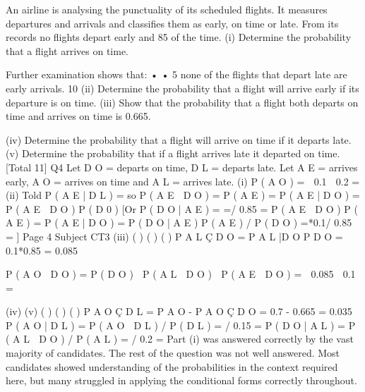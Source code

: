 \documentclass[a4paper,12pt]{article}
\begin{document}
An airline is analysing the punctuality of its scheduled flights. It measures departures
and arrivals and classifies them as early, on time or late. From its records no flights
depart early and 85%
of the time.
(i)
Determine the probability that a flight arrives on time.

Further examination shows that:
•
•
5
none of the flights that depart late are early arrivals.
10%
(ii) Determine the probability that a flight will arrive early if its departure is on
time.
(iii) Show that the probability that a flight both departs on time and arrives on time
is 0.665.

(iv) Determine the probability that a flight will arrive on time if it departs late. 
(v)
 Determine the probability that if a flight arrives late it departed on time. 
[Total 11]
Q4
Let D O = departs on time, D L = departs late.
Let A E = arrives early, A O = arrives on time and A L = arrives late.
(i) P ( A O ) \;=  0.1  0.2 \;= 
(ii) Told P ( A E | D L ) \;= so P ( A E  D O ) \;=\; P ( A E ) \;= 
P ( A E | D O ) \;=\;
P ( A E  D O )
P ( D 0 )
[Or P ( D O | A E ) \;=\;
\;=/ 0.85 \;=
P ( A E  D O )
P ( A E )
\;=
P ( A E | D O ) \;=\; P ( D O | A E ) P ( A E ) / P ( D O ) \;=*0.1/ 0.85 \;= ]
Page 4
Subject CT3 %
(iii)
(
)
(
) ( )
P A L Ç D O = P A L |D O P D O = 0.1*0.85 = 0.085

P ( A O  D O ) \;=\; P ( D O )  P ( A L  D O )  P ( A E  D O ) \;=  0.085  0.1
\;=

(iv)
(v)
(
)
( ) (
)
P A O Ç D L = P A O - P A O Ç D O = 0.7 - 0.665 = 0.035 
P ( A O | D L ) \;=\; P ( A O  D L ) / P ( D L ) \;= / 0.15 \;= 
P ( D O | A L ) \;=\; P ( A L  D O ) / P ( A L ) \;= / 0.2 \;= 
Part (i) was answered correctly by the vast majority of candidates. The
rest of the question was not well answered. Most candidates showed
understanding of the probabilities in the context required here, but
many struggled in applying the conditional forms correctly throughout.
\end{document}
